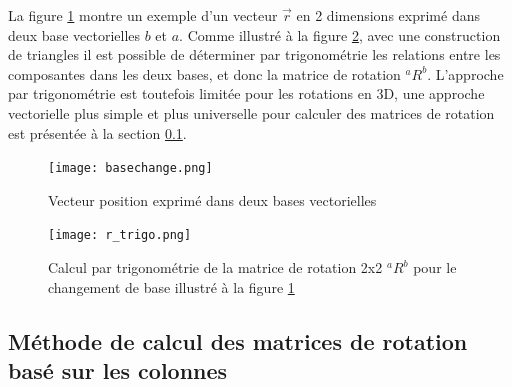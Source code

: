 \begin{example}

La figure \ref{fig:basechange2d} montre un exemple d'un vecteur $\vec{r}$ en 2 dimensions exprimé dans deux base vectorielles $b$ et $a$. Comme illustré à la figure \ref{fig:r_trigo}, avec une construction de triangles il est possible de déterminer par trigonométrie les relations entre les composantes dans les deux bases, et donc la matrice de rotation ${}^aR^b$. L'approche par trigonométrie est toutefois limitée pour les rotations en 3D, une approche vectorielle plus simple et plus universelle pour calculer des matrices de rotation est présentée à la section \ref{sec:calmat}.
\begin{figure}[H]
	\centering
		\texttt{[image: basechange.png]}
	\caption{Vecteur position exprimé dans deux bases vectorielles}
	\label{fig:basechange2d}
\end{figure}
\begin{figure}[H]
	\centering
		\texttt{[image: r\_trigo.png]}
	\caption{Calcul par trigonométrie de la matrice de rotation 2x2 ${}^aR^b$ pour le changement de base illustré à la figure \ref{fig:basechange2d}}
	\label{fig:r_trigo}
\end{figure}

\end{example} 



\subsection{Méthode de calcul des matrices de rotation basé sur les colonnes}
\label{sec:calmat}

